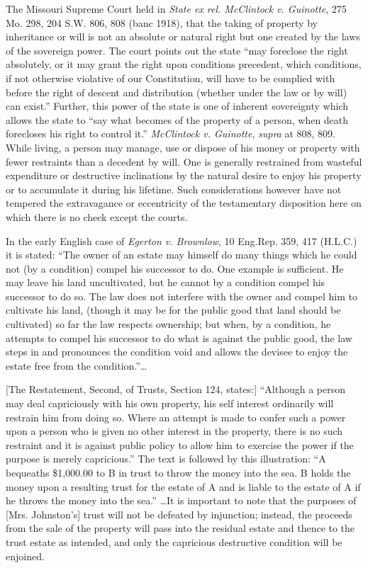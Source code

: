 The Missouri Supreme Court held in \textit{State ex rel. McClintock v.
Guinotte}, 275 Mo. 298, 204 S.W. 806, 808 (banc 1918), that the taking of
property by inheritance or will is not an absolute or natural right but one
created by the laws of the sovereign power. The court points out the state
``may foreclose the right absolutely, or it may grant the right upon conditions
precedent, which conditions, if not otherwise violative of our Constitution,
will have to be complied with before the right of descent and distribution
(whether under the law or by will) can exist.'' Further, this power of the
state is one of inherent sovereignty which allows the state to ``say what
becomes of the property of a person, when death forecloses his right to control
it.'' \textit{McClintock v. Guinotte},\textit{ supra} at 808, 809. While
living, a person may manage, use or dispose of his money or property with fewer
restraints than a decedent by will. One is generally restrained from wasteful
expenditure or destructive inclinations by the natural desire to enjoy his
property or to accumulate it during his lifetime. Such considerations however
have not tempered the extravagance or eccentricity of the testamentary
disposition here on which there is no check except the courts.

In the early English case of \textit{Egerton v. Brownlow}, 10 Eng.Rep. 359, 417
(H.L.C.) it is stated: ``The owner of an estate may himself do many things which
he could not (by a condition) compel his successor to do. One example is
sufficient. He may leave his land uncultivated, but he cannot by a condition
compel his successor to do so. The law does not interfere with the owner and
compel him to cultivate his land, (though it may be for the public good that
land should be cultivated) so far the law respects ownership; but when, by a
condition, he attempts to compel his successor to do what is against the public
good, the law steps in and pronounces the condition void and allows the devisee
to enjoy the estate free from the condition.''\ldots 

[The Restatement, Second, of Trusts, Section 124, states:] ``Although a person
may deal capriciously with his own property, his self interest ordinarily will
restrain him from doing so. Where an attempt is made to confer such a power
upon a person who is given no other interest in the property, there is no such
restraint and it is against public policy to allow him to exercise the power if
the purpose is merely capricious.'' The text is followed by this illustration:
``A bequeaths \$1,000.00 to B in trust to throw the money into the sea. B holds
the money upon a resulting trust for the estate of A and is liable to the
estate of A if he throws the money into the sea.'' \ldots It is important to
note that the purposes of [Mrs. Johnston's] trust will not be defeated by
injunction; instead, the proceeds from the sale of the property will pass into
the residual estate and thence to the trust estate as intended, and only the
capricious destructive condition will be enjoined.

